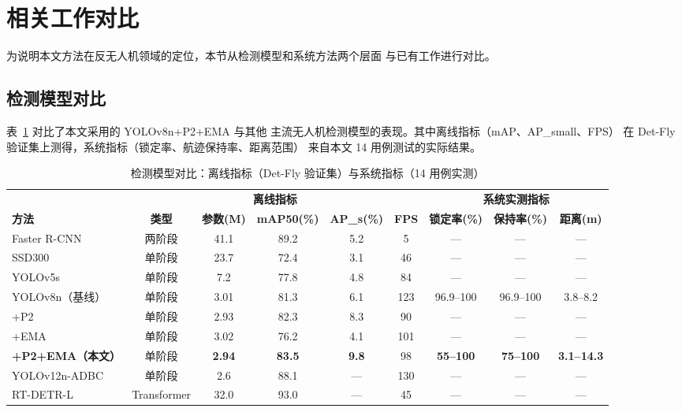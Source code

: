 \documentclass[12pt, a4paper]{ctexart}
\begin{document}
\section{相关工作对比}
\label{sec:related}

为说明本文方法在反无人机领域的定位，本节从检测模型和系统方法两个层面
与已有工作进行对比。

\subsection{检测模型对比}

表~\ref{tab:model_compare} 对比了本文采用的 YOLOv8n+P2+EMA 与其他
主流无人机检测模型的表现。其中离线指标（mAP、AP\_small、FPS）
在 Det-Fly 验证集上测得，系统指标（锁定率、航迹保持率、距离范围）
来自本文 14 用例测试的实际结果。

\begin{table}[H]
\centering
\caption{检测模型对比：离线指标（Det-Fly 验证集）与系统指标（14 用例实测）}
\label{tab:model_compare}
\small
\begin{tabular}{p{2.5cm}ccccc|ccc}
\toprule
 & \multicolumn{5}{c|}{\textbf{离线指标}} & \multicolumn{3}{c}{\textbf{系统实测指标}} \\
\textbf{方法} & \textbf{类型} & \textbf{参数(M)} & \textbf{mAP50(\%)} & \textbf{AP\_s(\%)} & \textbf{FPS} & \textbf{锁定率(\%)} & \textbf{保持率(\%)} & \textbf{距离(m)} \\
\midrule
Faster R-CNN\cite{faster_rcnn} & 两阶段 & 41.1 & 89.2 & 5.2 & 5 & — & — & — \\
SSD300\cite{ssd} & 单阶段 & 23.7 & 72.4 & 3.1 & 46 & — & — & — \\
YOLOv5s\cite{yolov5} & 单阶段 & 7.2 & 77.8 & 4.8 & 84 & — & — & — \\
YOLOv8n（基线） & 单阶段 & 3.01 & 81.3 & 6.1 & 123 & 96.9--100 & 96.9--100 & 3.8--8.2 \\
\quad+P2 & 单阶段 & 2.93 & 82.3 & 8.3 & 90 & — & — & — \\
\quad+EMA & 单阶段 & 3.02 & 76.2 & 4.1 & 101 & — & — & — \\
\textbf{+P2+EMA（本文）} & 单阶段 & \textbf{2.94} & \textbf{83.5} & \textbf{9.8} & 98 & \textbf{55--100} & \textbf{75--100} & \textbf{3.1--14.3} \\
YOLOv12n-ADBC\cite{yolov12_adbc} & 单阶段 & 2.6 & 88.1 & — & 130 & — & — & — \\
RT-DETR-L\cite{rt_detr} & Transformer & 32.0 & 93.0 & — & 45 & — & — & — \\
\bottomrule
\end{tabular}
\end{table}
\end{document}
